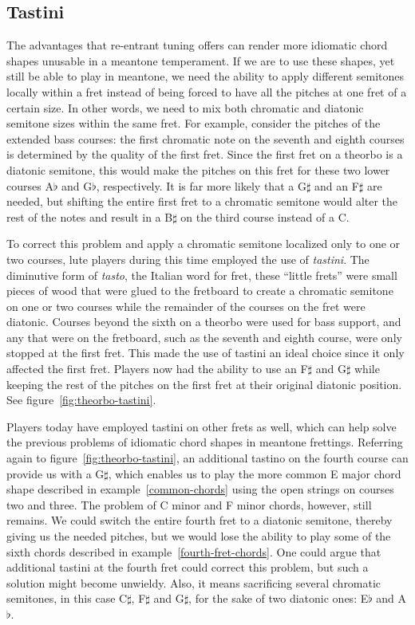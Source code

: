 \subsection{Tastini}

The advantages that re-entrant tuning offers can render more idiomatic chord shapes unusable in a meantone temperament.
If we are to use these shapes, yet still be able to play in meantone, we need the ability to apply different semitones
locally within a fret instead of being forced to have all the pitches at one fret of a certain size. In other words, we
need to mix both chromatic and diatonic semitone sizes within the same fret. For example, consider the pitches of the
extended bass courses: the first chromatic note on the seventh and eighth courses is determined by the quality of the
first fret. Since the first fret on a theorbo is a diatonic semitone, this would make the pitches on this fret for these
two lower courses A$\flat$ and G$\flat$, respectively. It is far more likely that a G$\sharp$ and an F$\sharp$ are
needed, but shifting the entire first fret to a chromatic semitone would alter the rest of the notes and result in a
B$\sharp$ on the third course instead of a C.

To correct this problem and apply a chromatic semitone localized only to one or two courses, lute players during this
time employed the use of \textit{tastini}. The diminutive form of \textit{tasto}, the Italian word for fret, these
``little frets'' were small pieces of wood that were glued to the fretboard to create a chromatic semitone on one or two
courses while the remainder of the courses on the fret were diatonic. Courses beyond the sixth on a theorbo were used
for bass support, and any that were on the fretboard, such as the seventh and eighth course, were only stopped at the
first fret. This made the use of tastini an ideal choice since it only affected the first fret. Players now had the
ability to use an F$\sharp$ and G$\sharp$ while keeping the rest of the pitches on the first fret at their original
diatonic position. See figure~\ref{fig:theorbo-tastini}.



Players today have employed tastini on other frets as well, which can help solve the previous problems of idiomatic
chord shapes in meantone frettings. Referring again to figure~\ref{fig:theorbo-tastini}, an additional tastino on the
fourth course can provide us with a G$\sharp$, which enables us to play the more common E major chord shape described in
example~\ref{common-chords} using the open strings on courses two and three. The problem of C minor and F minor chords,
however, still remains. We could switch the entire fourth fret to a diatonic semitone, thereby giving us the needed
pitches, but we would lose the ability to play some of the sixth chords described in example~\ref{fourth-fret-chords}.
One could argue that additional tastini at the fourth fret could correct this problem, but such a solution might become
unwieldy. Also, it means sacrificing several chromatic semitones, in this case C$\sharp$, F$\sharp$ and G$\sharp$, for
the sake of two diatonic ones: E$\flat$ and A$\flat$.

